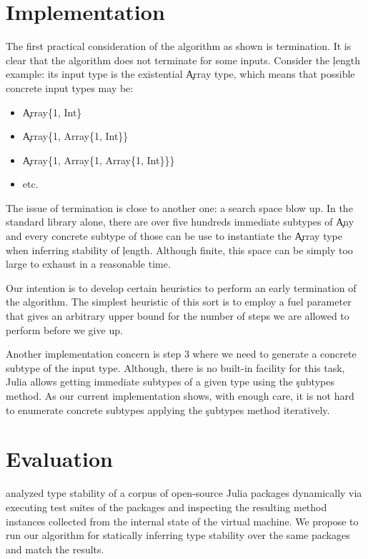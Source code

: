 \documentclass[sigplan,screen]{acmart}
\begin{document}
\section{Implementation}%
\label{sec:impl}

The first practical consideration of the algorithm as shown is termination. It
is clear that the algorithm does not terminate for some inputs. Consider the
\c{length} example: its input type is the existential \c{Array} type, which
means that possible concrete input types may be:
\begin{itemize}

  \item \c{Array\{1, Int\}}
  \item \c{Array\{1, Array\{1, Int\}\}}
  \item \c{Array\{1, Array\{1, Array\{1, Int\}\}\}}
  \item etc.
\end{itemize}

The issue of termination is close to another one: a search space blow up.
In the standard library alone, there are over five hundreds immediate subtypes
of \c{Any} and every concrete subtype of those can be use to instantiate the
\c{Array} type when inferring stability of \c{length}. Although finite, this
space can be simply too large to exhaust in a reasonable time.

Our intention is to develop certain heuristics to perform an early termination
of the algorithm. The simplest heuristic of this sort is to employ a fuel
parameter that gives an arbitrary upper bound for the number of steps we are
allowed to perform before we give up.

Another implementation concern is step 3 where we need to generate a concrete
subtype of the input type. Although, there is no built-in facility for this
task, Julia allows getting immediate subtypes of a given type using the
\c{subtypes} method. As our current implementation shows, with enough care, it
is not hard to enumerate concrete subtypes applying the \c{subtypes} method
iteratively.

\section{Evaluation}%
\label{sec:eval}

\citet{Pelenitsyn21} analyzed type stability of a corpus of open-source Julia
packages dynamically via executing test suites of the packages and inspecting the
resulting method instances collected from the internal state of the virtual
machine. We propose to run our algorithm for statically inferring type stability
over the same packages and match the results.



\end{document}

